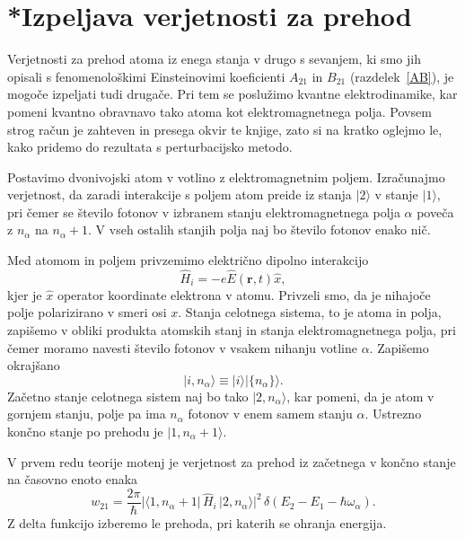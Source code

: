 \section{*Izpeljava verjetnosti za prehod}
\label{chap:verjetnost}
Verjetnosti za prehod atoma iz enega stanja v drugo s sevanjem, ki
smo jih opisali s fenomenološkimi Einsteinovimi koeficienti $A_{21}$
in $B_{21}$ (razdelek~\ref{AB}), 
je mogoče izpeljati tudi drugače.
Pri tem se poslužimo kvantne elektrodinamike, 
kar pomeni kvantno obravnavo 
tako atoma kot elektromagnetnega polja. Povsem strog račun je zahteven in presega
okvir te knjige, zato si na kratko oglejmo le, kako pridemo do rezultata s
perturbacijsko metodo.

Postavimo dvonivojski atom v votlino z elektromagnetnim poljem.
Izračunajmo verjetnost, da zaradi interakcije s poljem atom
preide iz stanja $|2\rangle$ v stanje $|1\rangle$, pri čemer se
število fotonov v izbranem stanju elektromagnetnega polja $\alpha$
poveča z $n_{\alpha}$ na $n_{\alpha}+1$. V vseh ostalih stanjih
polja naj bo število fotonov enako nič.

Med atomom in poljem privzemimo električno dipolno interakcijo 
\begin{equation}
\hat{H}_{i}=-e\hat{E}(\mathbf{r},t)\hat{x},
\label{4.47}
\end{equation}
kjer je $\hat{x}$ operator koordinate elektrona v atomu. Privzeli
smo, da je nihajoče polje polarizirano v smeri osi $x$. Stanja celotnega sistema, 
to je atoma in polja, zapišemo v obliki produkta atomskih stanj in
stanja elektromagnetnega polja, pri čemer moramo navesti število fotonov
v vsakem nihanju votline $\alpha$. Zapišemo okrajšano
\begin{equation}
|i,n_{\alpha}\rangle\equiv|i\rangle|\{n_{\alpha}\}\rangle.
\label{4.48}
\end{equation}
Začetno stanje celotnega sistem naj bo tako $|2,n_{\alpha}\rangle$, kar pomeni, da je
atom v gornjem stanju, polje pa ima $n_{\alpha}$ fotonov v enem samem stanju $\alpha$.
Ustrezno končno stanje po prehodu je $|1,n_{\alpha}+1\rangle$.

V prvem redu teorije motenj je verjetnost za prehod iz začetnega v končno stanje
na časovno enoto enaka
\begin{equation}
w_{21}=\frac{2\pi}{\hbar}|\langle1,n_{\alpha}+
1|\,\hat{H}_{i}\,|2,n_{\alpha}\rangle|^{2}\,
\delta(E_{2}-E_{1}-\hbar\omega_{\alpha}).
\label{4.49}
\end{equation}
Z delta funkcijo izberemo le prehoda, pri katerih se ohranja
energija.

